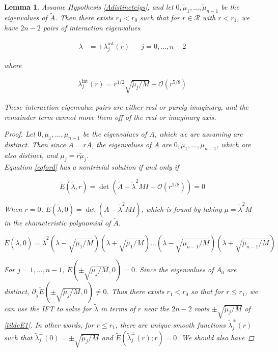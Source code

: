 \documentclass[12pt]{article}
\newtheorem{lemma}{Lemma}
\begin{document}
\begin{lemma}\label{inteigslemma}
Assume Hypothesis \ref{Adistincteigs}, and let $0, \tilde{\mu}_1, \dots, \tilde{\mu}_{n-1}$ be the eigenvalues of $\tilde{A}$. Then there exists $r_1 < r_0$ such that for $r \in \mathcal{R}$ with $r < r_1$, we have $2n - 2$ pairs of interaction eigenvalues

\begin{align*}
\lambda &= \pm \lambda^{\text{int}}_j(r) && j = 0, \dots, n-2
\end{align*}

where

\begin{align*}
\lambda^{\text{int}}_j(r) = r^{1/2} \sqrt{\tilde{\mu}_j / M} + \mathcal{O}(r^{5/8})
\end{align*}

These interaction eigenvalue pairs are either real or purely imaginary, and the remainder term cannot move them off of the real or imaginary axis.


\begin{proof}
Let $0, \mu_1, \dots, \mu_{n-1}$ be the eigenvalues of $A$, which we are assuming are distinct. Then since $A = r \tilde{A}$, the eigenvalues of $\tilde{A}$ are $0, \tilde{\mu}_1, \dots, \tilde{\mu}_{n-1}$, which are also distinct, and $\mu_j = r \tilde{\mu}_j$.\\

Equation \eqref{eqford} has a nontrivial solution if and only if

\[
\tilde{E}(\tilde{\lambda},r) = \det
( \tilde{A} - \tilde{\lambda}^2 MI + \mathcal{O}(r^{1/8})) = 0
\]

When $r = 0$, $\tilde{E}(\tilde{\lambda}, 0) = \det(\tilde{A} - \tilde{\lambda}^2 MI)$, which is found by taking $\mu = \tilde{\lambda}^2 M$ in the characteristic polynomial of $\tilde{A}$.

\begin{equation}\label{tildeE1}
\tilde{E}(\tilde{\lambda}, 0) = \tilde{\lambda}^2
\left( \tilde{\lambda} - \sqrt{\tilde{\mu}_1 / M} \right)
\left( \tilde{\lambda} + \sqrt{\tilde{\mu}_1 / M} \right) \dots
\left( \tilde{\lambda} - \sqrt{\tilde{\mu}_{n-1} / M} \right)
\left( \tilde{\lambda} + \sqrt{\tilde{\mu}_{n-1} / M} \right)
\end{equation}

For $j = 1, \dots, n-1$, $\tilde{E}(\pm \sqrt{\tilde{\mu}_j / M}, 0) = 0$. Since the eigenvalues of $A_0$ are distinct, $\partial_{\tilde{\lambda}} \tilde{E}(\pm \sqrt{\tilde{\mu}_j / M}, 0) \neq 0$. Thus there exists $r_1 < r_0$ so that for $r \leq r_1$, we can use the IFT to solve for $\tilde{\lambda}$ in terms of $r$ near the $2n-2$ roots $\pm \sqrt{\tilde{\mu}_j / M}$ of \eqref{tildeE1}. In other words, for $r \leq r_1$, there are unique smooth functions $\tilde{\lambda}_j^\pm(r)$ such that $\tilde{\lambda}_j^\pm(0) = \pm \sqrt{\tilde{\mu}_j / M}$ and $\tilde{E}(\tilde{\lambda}_j^\pm(r); r) = 0$. We should also have


\end{proof}
\end{lemma}
\end{document}
